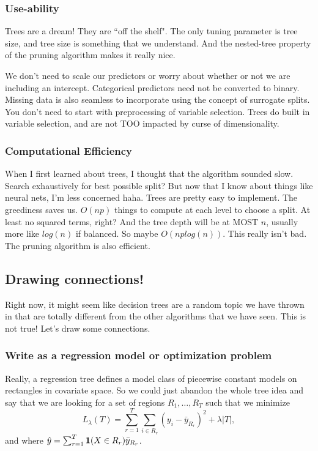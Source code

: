 \subsubsection{Use-ability}

Trees are a dream! They are ``off the shelf". The only tuning parameter is tree size, and tree size is something that we understand. And the nested-tree property of the pruning algorithm makes it really nice. 

We don't need to scale our predictors or worry about whether or not we are including an intercept. Categorical predictors need not be converted to binary. Missing data is also seamless to incorporate using the concept of surrogate splits. 
You don't need to start with preprocessing of variable selection. Trees do built in variable selection, and are not TOO impacted by curse of dimensionality. 

\subsubsection{Computational Efficiency}

When I first learned about trees, I thought that the algorithm sounded slow. Search exhaustively for best possible split? But now that I know about things like neural nets, I'm less concerned haha. Trees are pretty easy to implement. The greediness saves us. $O(np)$ things to compute at each level to choose a split. At least no squared terms, right? And the tree depth will be at MOST $n$, usually more like $log(n)$ if balanced. So maybe $O(np log(n))$. This really isn't bad. The pruning algorithm is also efficient. 

\subsection{Drawing connections!}

Right now, it might seem like decision trees are a random topic we have thrown in that are totally different from the other algorithms that we have seen. This is not true! Let's draw some connections.

\subsubsection{Write as a regression model or optimization problem}

Really, a regression tree defines a model class of piecewise constant models on rectangles in covariate space. So we could just abandon the whole tree idea and say that we are looking for a set of regions $R_1,\ldots, R_T$ such that we minimize
$$
L_\lambda(T) = \sum_{r=1}^T\sum_{i \in R_r} (y_i - \bar{y}_{R_r})^2 + \lambda |T|,
$$
and where $\hat{y} = \sum_{r=1}^T \bold{1}(X \in R_r) \bar{y}_{R_r}$. 

